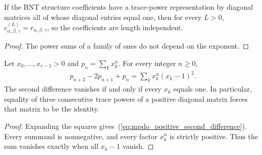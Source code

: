 \begin{lemma}%
    \label{thm:mpdo_bnt_label_length_independent_of_unit_entries}
    \leanok
    If the BNT structure coefficients have a trace-power representation by
    diagonal matrices all of whose diagonal entries equal one, then for
    every $L>0$, $c^{(L)}_{\alpha,\beta,\gamma}
        = r_{\alpha,\beta,\gamma}$, so the coefficients are length
    independent.
\end{lemma}
\begin{proof}\leanok
    The power sums of a family of ones do not depend on the exponent.
\end{proof}

\begin{lemma}%
    \label{thm:positive_power_second_difference}
    \leanok
    Let $x_0,\ldots,x_{r-1}>0$ and $p_n=\sum_k x_k^n$.
    For every integer $n\geq0$,
    \begin{align}
        p_{n+2}-2p_{n+1}+p_n
        =\sum_k x_k^n(x_k-1)^2.
        \label{eq:mpdo_positive_second_difference}
    \end{align}
    The second difference vanishes if and only if every $x_k$ equals
    one. In particular, equality of three consecutive trace powers of
    a positive diagonal matrix forces that matrix to be the identity.
\end{lemma}
\begin{proof}\leanok
    Expanding the squares gives~(\ref{eq:mpdo_positive_second_difference}).
    Every summand is nonnegative, and every factor $x_k^n$ is strictly
    positive. Thus the sum vanishes exactly when all $x_k-1$ vanish.
\end{proof}

